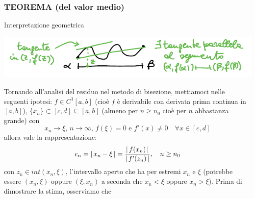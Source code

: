 \documentclass[12pt]{article}
\DeclarePairedDelimiter{\abs}{\lvert}{\rvert}
\begin{document}
\subsubsection{TEOREMA (del valor medio)}
\begin{center}
\end{center}
Interpretazione geometrica
\begin{center}
   \includegraphics{pag25} 
\end{center}
Tornando all'analisi del residuo nel metodo di bisezione, mettiamoci nelle seguenti ipotesi: $f\in C^1[a,b]$ (cioè $f$ è derivabile con derivata prima continua in $[a,b]$), $\{x_n\}\subset[c,d]\subseteq[a,b]$ (almeno per $n\ge n_0$ cioè per $n$ abbastanza grande) con \[x_n \to \xi,\,n \to \infty,\,f(\xi)=0 \text{ e } f'(x)\ne 0\quad \forall x\in [c,d]\] allora vale la rappresentazione:
\[e_n = \abs{\,x_n-\xi\,} = \frac{\abs{\,f(x_n)\,}}{\abs{\,f'(z_n)\,}},\quad n\ge n_0\] con $z_n\in int(x_n,\xi)$, l'intervallo aperto che ha per estremi $x_n$ e $\xi$ (potrebbe essere $(x_n,\xi)$ oppure $(\xi,x_n)$ a seconda che $x_n<\xi$ oppure $x_n>\xi$).
\newline \newline
Prima di dimostrare la stima, osserviamo che
\end{document}

